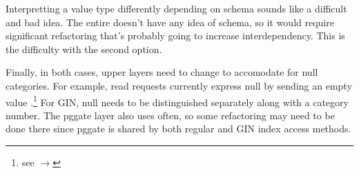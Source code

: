 Interpretting a value type differently depending on schema sounds like a
difficult and bad idea.  The entire  doesn't have any
idea of schema, so it would require significant refactoring that's probably
going to increase interdependency.  This is the difficulty with the second
option.

Finally, in both cases, upper layers need to change to accomodate for null
categories.  For example, read requests currently express null by sending an
empty value .\footnote{see
 $\rightarrow$ }  For
GIN, null needs to be distinguished separately along with a category number.
The pggate layer also uses  often, so some refactoring
may need to be done there since pggate is shared by both regular and GIN index
access methods.
